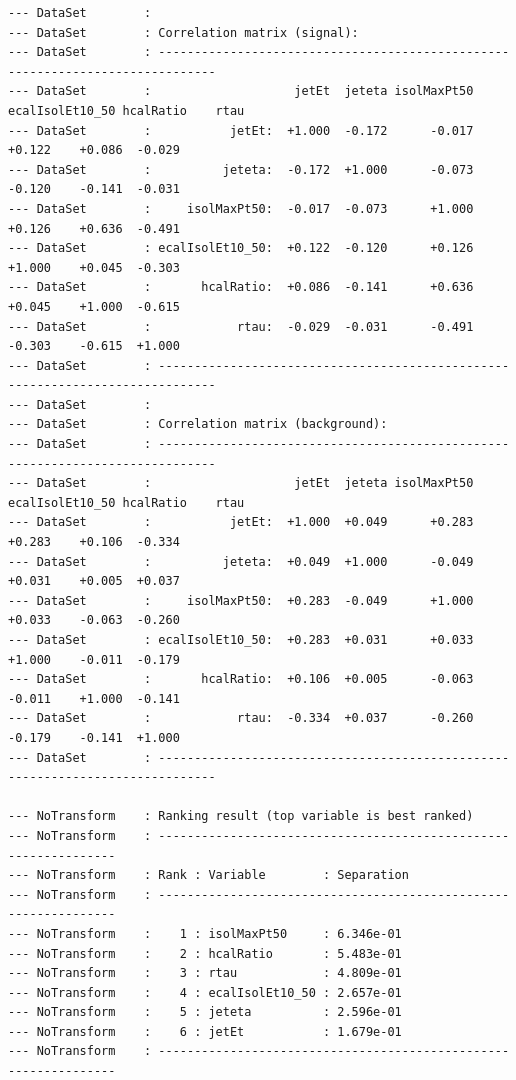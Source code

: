 \begin{verbatim}
--- DataSet        : 
--- DataSet        : Correlation matrix (signal):
--- DataSet        : ------------------------------------------------------------------------------
--- DataSet        :                    jetEt  jeteta isolMaxPt50 ecalIsolEt10_50 hcalRatio    rtau
--- DataSet        :           jetEt:  +1.000  -0.172      -0.017          +0.122    +0.086  -0.029
--- DataSet        :          jeteta:  -0.172  +1.000      -0.073          -0.120    -0.141  -0.031
--- DataSet        :     isolMaxPt50:  -0.017  -0.073      +1.000          +0.126    +0.636  -0.491
--- DataSet        : ecalIsolEt10_50:  +0.122  -0.120      +0.126          +1.000    +0.045  -0.303
--- DataSet        :       hcalRatio:  +0.086  -0.141      +0.636          +0.045    +1.000  -0.615
--- DataSet        :            rtau:  -0.029  -0.031      -0.491          -0.303    -0.615  +1.000
--- DataSet        : ------------------------------------------------------------------------------
--- DataSet        : 
--- DataSet        : Correlation matrix (background):
--- DataSet        : ------------------------------------------------------------------------------
--- DataSet        :                    jetEt  jeteta isolMaxPt50 ecalIsolEt10_50 hcalRatio    rtau
--- DataSet        :           jetEt:  +1.000  +0.049      +0.283          +0.283    +0.106  -0.334
--- DataSet        :          jeteta:  +0.049  +1.000      -0.049          +0.031    +0.005  +0.037
--- DataSet        :     isolMaxPt50:  +0.283  -0.049      +1.000          +0.033    -0.063  -0.260
--- DataSet        : ecalIsolEt10_50:  +0.283  +0.031      +0.033          +1.000    -0.011  -0.179
--- DataSet        :       hcalRatio:  +0.106  +0.005      -0.063          -0.011    +1.000  -0.141
--- DataSet        :            rtau:  -0.334  +0.037      -0.260          -0.179    -0.141  +1.000
--- DataSet        : ------------------------------------------------------------------------------

--- NoTransform    : Ranking result (top variable is best ranked)
--- NoTransform    : ----------------------------------------------------------------
--- NoTransform    : Rank : Variable        : Separation
--- NoTransform    : ----------------------------------------------------------------
--- NoTransform    :    1 : isolMaxPt50     : 6.346e-01
--- NoTransform    :    2 : hcalRatio       : 5.483e-01
--- NoTransform    :    3 : rtau            : 4.809e-01
--- NoTransform    :    4 : ecalIsolEt10_50 : 2.657e-01
--- NoTransform    :    5 : jeteta          : 2.596e-01
--- NoTransform    :    6 : jetEt           : 1.679e-01
--- NoTransform    : ----------------------------------------------------------------


\end{verbatim}
